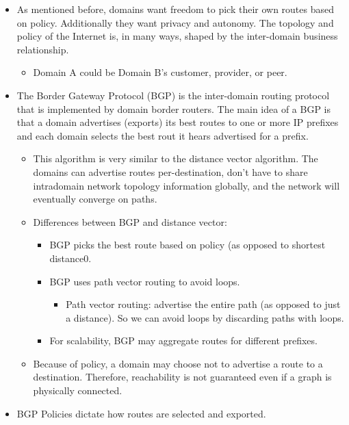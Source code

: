 \begin{itemize}
\tightlist
\item
  As mentioned before, domains want freedom to pick their own routes
  based on policy. Additionally they want privacy and autonomy. The
  topology and policy of the Internet is, in many ways, shaped by the
  inter-domain business relationship.

  \begin{itemize}
  \tightlist
  \item
    Domain A could be Domain B's customer, provider, or peer.
  \end{itemize}
\item
  The Border Gateway Protocol (BGP) is the inter-domain routing protocol
  that is implemented by domain border routers. The main idea of a BGP
  is that a domain advertises (exports) its best routes to one or more
  IP prefixes and each domain selects the best rout it hears advertised
  for a prefix.

  \begin{itemize}
  \tightlist
  \item
    This algorithm is very similar to the distance vector algorithm. The
    domains can advertise routes per-destination, don't have to share
    intradomain network topology information globally, and the network
    will eventually converge on paths.
  \item
    Differences between BGP and distance vector:

    \begin{itemize}
    \tightlist
    \item
      BGP picks the best route based on policy (as opposed to shortest
      distance0.
    \item
      BGP uses path vector routing to avoid loops.

      \begin{itemize}
      \tightlist
      \item
        Path vector routing: advertise the entire path (as opposed to
        just a distance). So we can avoid loops by discarding paths with
        loops.
      \end{itemize}
    \item
      For scalability, BGP may aggregate routes for different prefixes.
    \end{itemize}
  \item
    Because of policy, a domain may choose not to advertise a route to a
    destination. Therefore, reachability is not guaranteed even if a
    graph is physically connected.
  \end{itemize}
\item
  BGP Policies dictate how routes are selected and exported.


\end{itemize}
